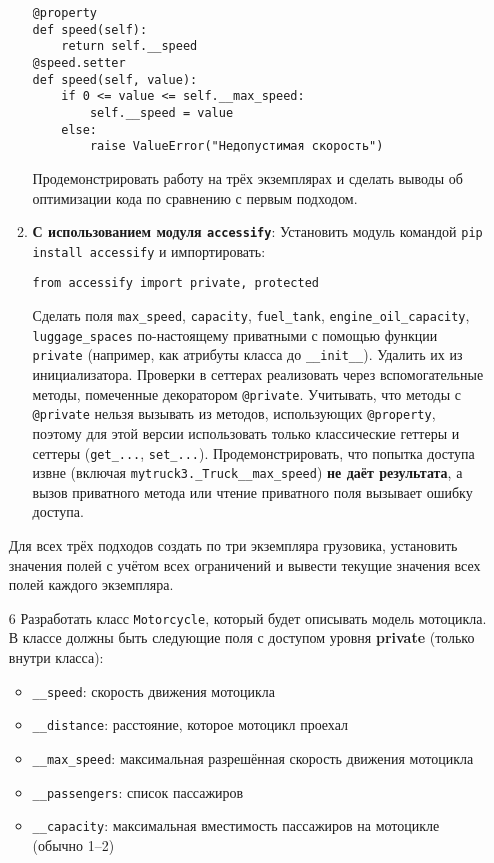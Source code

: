 \begin{enumerate}
\begin{enumerate}
\begin{verbatim}
@property
def speed(self):
    return self.__speed
@speed.setter
def speed(self, value):
    if 0 <= value <= self.__max_speed:
        self.__speed = value
    else:
        raise ValueError("Недопустимая скорость")
    \end{verbatim}  
    Продемонстрировать работу на трёх экземплярах и сделать выводы об оптимизации кода по сравнению с первым подходом.
    \item \textbf{С использованием модуля \texttt{accessify}}:  
    Установить модуль командой \texttt{pip install accessify} и импортировать:  
    \begin{verbatim}
from accessify import private, protected
    \end{verbatim}  
    Сделать поля \texttt{max\_speed}, \texttt{capacity}, \texttt{fuel\_tank}, \texttt{engine\_oil\_capacity}, \texttt{luggage\_spaces} по-настоящему приватными с помощью функции \texttt{private} (например, как атрибуты класса до \texttt{\_\_init\_\_}). Удалить их из инициализатора.  
    Проверки в сеттерах реализовать через вспомогательные методы, помеченные декоратором \texttt{@private}.  
    Учитывать, что методы с \texttt{@private} нельзя вызывать из методов, использующих \texttt{@property}, поэтому для этой версии использовать только классические геттеры и сеттеры (\texttt{get\_...}, \texttt{set\_...}).  
    Продемонстрировать, что попытка доступа извне (включая \texttt{mytruck3.\_Truck\_\_max\_speed}) \textbf{не даёт результата}, а вызов приватного метода или чтение приватного поля вызывает ошибку доступа.
\end{enumerate}
Для всех трёх подходов создать по три экземпляра грузовика, установить значения полей с учётом всех ограничений и вывести текущие значения всех полей каждого экземпляра.
\item[6] Разработать класс \texttt{Motorcycle}, который будет описывать модель мотоцикла. В классе должны быть следующие поля с доступом уровня \textbf{private} (только внутри класса):
\begin{itemize}
    \item \texttt{\_\_speed}: скорость движения мотоцикла  
    \item \texttt{\_\_distance}: расстояние, которое мотоцикл проехал  
    \item \texttt{\_\_max\_speed}: максимальная разрешённая скорость движения мотоцикла  
    \item \texttt{\_\_passengers}: список пассажиров  
    \item \texttt{\_\_capacity}: максимальная вместимость пассажиров на мотоцикле (обычно 1–2)  

\end{itemize}
\end{enumerate}
